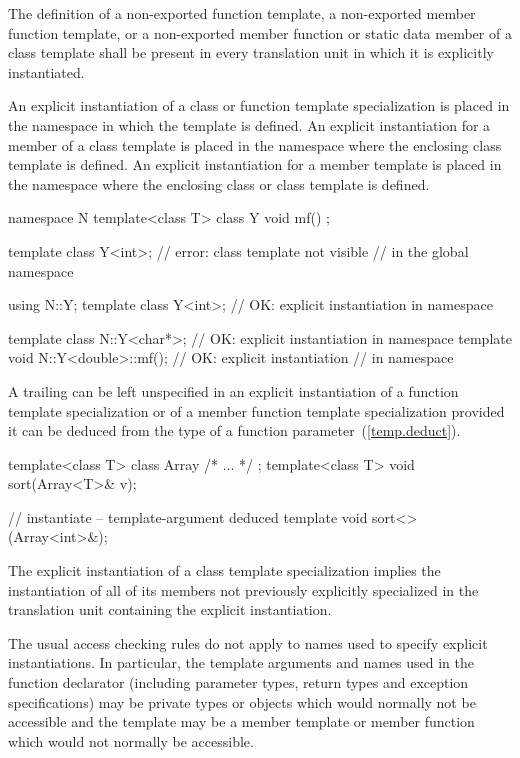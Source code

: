 \pnum
The definition of a non-exported function template, a non-exported member
function template, or a non-exported member function or static
data member of a class template shall be present in every
translation unit in which it is explicitly instantiated.

\pnum
An explicit instantiation of a class or function template specialization is
placed in the namespace in which the template is defined.
An explicit instantiation for a member of a class template is placed in
the namespace where the enclosing class template is defined.
An explicit instantiation for a member template is placed in the namespace
where the enclosing class or class template is defined.
\enterexample

\begin{codeblock}
namespace N {
	template<class T> class Y { void mf() { } };
}

template class Y<int>;          // error: class template  not visible
                                // in the global namespace

using N::Y;
template class Y<int>;          // OK: explicit instantiation in namespace 

template class N::Y<char*>;             // OK: explicit instantiation in namespace 
template void N::Y<double>::mf();       // OK: explicit instantiation
                                        // in namespace 
\end{codeblock}
\exitexampleb

\pnum
A trailing
can be left unspecified in an explicit instantiation of a function template
specialization or of a member function template specialization provided
it can be deduced from the type of a function parameter~(\ref{temp.deduct}).
\enterexample

\begin{codeblock}
template<class T> class Array { /* ... */ };
template<class T> void sort(Array<T>& v);

// instantiate  -- template-argument deduced
template void sort<>(Array<int>&);
\end{codeblock}
\exitexampleb

\pnum
The explicit instantiation of a class template specialization implies the
instantiation of all of its members not previously explicitly specialized in
the translation unit containing the explicit instantiation.

\pnum
The usual access checking rules do not apply to names used to specify
explicit instantiations.
\enternote
In particular, the template arguments and names used in the function
declarator (including parameter types, return types and exception
specifications) may be private types or objects which would normally
not be accessible and the template may be a member template or member
function which would not normally be accessible.
\exitnote

